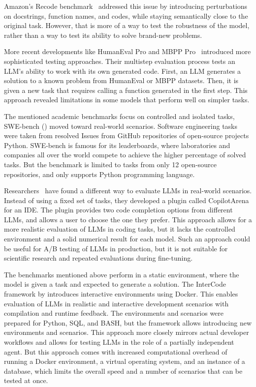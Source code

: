 Amazon's Recode benchmark~\cite{recode_wang2022} addressed this issue by introducing perturbations on docstrings, function names, and codes, while staying semantically close to the original task.
However, that is more of a way to test the robustness of the model, rather than a way to test its ability to solve brand-new problems.

More recent developments like HumanEval Pro and MBPP Pro~\cite{yu2024humanevalprombpppro} introduced more sophisticated testing approaches.
Their multistep evaluation process tests an LLM's ability to work with its own generated code.
First, an LLM generates a solution to a known problem from HumanEval or MBPP datasets.
Then, it is given a new task that requires calling a function generated in the first step.
This approach revealed limitations in some models that perform well on simpler tasks.

The mentioned academic benchmarks focus on controlled and isolated tasks, SWE-bench (\cite{jimenez2024swebenchlanguagemodelsresolve}) moved toward real-world scenarios.
Software engineering tasks were taken from resolved Issues from GitHub repositories of open-source projects Python.
SWE-bench is famous for its leaderboards, where laboratories and companies all over the world compete to achieve the higher percentage of solved tasks.
But the benchmark is limited to tasks from only 12 open-source repositories, and only supports Python programming language.

Researchers~\cite{chi2025copilotarenaplatformcode} have found a different way to evaluate LLMs in real-world scenarios.
Instead of using a fixed set of tasks, they developed a plugin called CopilotArena for an IDE.
The plugin provides two code completion options from different LLMs, and allows a user to choose the one they prefer.
This approach allows for a more realistic evaluation of LLMs in coding tasks, but it lacks the controlled environment and a solid numerical result for each model.
Such an approach could be useful for A/B testing of LLMs in production, but it is not suitable for scientific research and repeated evaluations during fine-tuning.

The benchmarks mentioned above perform in a static environment, where the model is given a task and expected to generate a solution.
The InterCode framework by\cite{yang2023intercodestandardizingbenchmarkinginteractive} introduces interactive environments using Docker.
This enables evaluation of LLMs in realistic and interactive development scenarios with compilation and runtime feedback.
The environments and scenarios were prepared for Python, SQL, and BASH, but the framework allows introducing new environments and scenarios.
This approach more closely mirrors actual developer workflows and allows for testing LLMs in the role of a partially independent agent.
But this approach comes with increased computational overhead of running a Docker environment, a virtual operating system, and an instance of a database, which limits the overall speed and a number of scenarios that can be tested at once.

